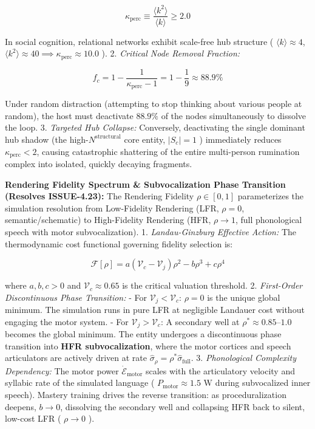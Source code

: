 \documentclass[11pt,a4paper]{article}
\theoremstyle{definition}
\theoremstyle{remark}
\begin{document}
\begin{equation}
\kappa_{\text{perc}} \equiv \frac{\langle k^2 \rangle}{\langle k \rangle} \ge 2.0
\end{equation}


In social cognition, relational networks exhibit scale-free hub structure ( $\langle k \rangle \approx 4$, $\langle k^2 \rangle \approx 40 \implies \kappa_{\text{perc}} \approx 10.0$ ).
2. \textit{Critical Node Removal Fraction:}


\begin{equation}
\boxed{f_c = 1 - \frac{1}{\kappa_{\text{perc}} - 1} = 1 - \frac{1}{9} \approx 88.9\%}
\end{equation}


Under random distraction (attempting to stop thinking about various people at random), the host must deactivate $88.9\%$ of the nodes simultaneously to dissolve the loop.
3. \textit{Targeted Hub Collapse:} Conversely, deactivating the single dominant hub shadow (the high-$N^{\text{structural}}$ core entity, $|S_c| = 1$ ) immediately reduces $\kappa_{\text{perc}} < 2$, causing catastrophic shattering of the entire multi-person rumination complex into isolated, quickly decaying fragments.

\textbf{Rendering Fidelity Spectrum \& Subvocalization Phase Transition (Resolves ISSUE-4.23):}
The Rendering Fidelity $\rho \in [0,1]$ parameterizes the simulation resolution from Low-Fidelity Rendering (LFR, $\rho = 0$, semantic/schematic) to High-Fidelity Rendering (HFR, $\rho \to 1$, full phonological speech with motor subvocalization).
1. \textit{Landau-Ginzburg Effective Action:} The thermodynamic cost functional governing fidelity selection is:


\begin{equation}
\mathcal{F}[\rho] = a\left(\mathcal{V}_c - \mathcal{V}_j\right) \rho^2 - b \rho^3 + c \rho^4
\end{equation}


where $a, b, c > 0$ and $\mathcal{V}_c \approx 0.65$ is the critical valuation threshold.
2. \textit{First-Order Discontinuous Phase Transition:}
- For $\mathcal{V}_j < \mathcal{V}_c$: $\rho = 0$ is the unique global minimum. The simulation runs in pure LFR at negligible Landauer cost without engaging the motor system.
- For $\mathcal{V}_j > \mathcal{V}_c$: A secondary well at $\rho^* \approx 0.85\text{--}1.0$ becomes the global minimum. The entity undergoes a discontinuous phase transition into \textbf{HFR subvocalization}, where the motor cortices and speech articulators are actively driven at rate $\hat{\sigma}_\rho = \rho^* \hat{\sigma}_{\text{full}}$.
3. \textit{Phonological Complexity Dependency:} The motor power $\dot{\mathcal{E}}_{\text{motor}}$ scales with the articulatory velocity and syllabic rate of the simulated language ( $P_{\text{motor}} \approx 1.5\text{ W}$ during subvocalized inner speech). Mastery training drives the reverse transition: as proceduralization deepens, $b \to 0$, dissolving the secondary well and collapsing HFR back to silent, low-cost LFR ( $\rho \to 0$ ).
\end{document}
